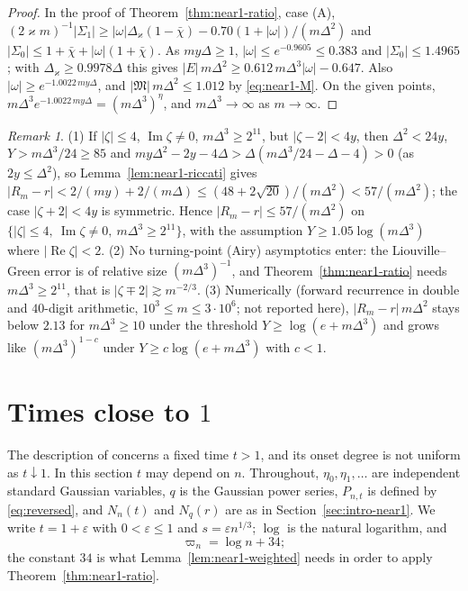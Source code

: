 \documentclass[11pt]{amsart}
\theoremstyle{definition}
\theoremstyle{remark}
\newtheorem{remark}[theorem]{Remark}
\numberwithin{equation}{section}
\newcommand{\eps}{\varepsilon}
\DeclareMathOperator{\re}{Re}
\DeclareMathOperator{\im}{Im}
\begin{document}
\begin{proof}
In the proof of Theorem~\ref{thm:near1-ratio}, case (A), $(2\varkappa m)^{-1}|\Sigma_1|\ge|\omega|\Delta_\varkappa(1-\bar\chi)-0.70(1+|\omega|)/(m\Delta^2)$ and $|\Sigma_0|\le1+\bar\chi+|\omega|(1+\bar\chi)$. As $my\Delta\ge1$, $|\omega|\le e^{-0.9605}\le0.383$ and $|\Sigma_0|\le1.4965$; with $\Delta_\varkappa\ge0.9978\Delta$ this gives $|E|\,m\Delta^2\ge0.612\,m\Delta^3|\omega|-0.647$. Also $|\omega|\ge e^{-1.0022\,my\Delta}$, and $|\mathfrak M|\,m\Delta^2\le1.012$ by \eqref{eq:near1-M}. On the given points, $m\Delta^3e^{-1.0022\,my\Delta}=(m\Delta^3)^\eta$, and $m\Delta^3\to\infty$ as $m\to\infty$.
\end{proof}

\begin{remark}\label{rem:near1-ratio}
(1) If $|\zeta|\le4$, $\im\zeta\ne0$, $m\Delta^3\ge2^{11}$, but $|\zeta-2|<4y$, then $\Delta^2<24y$, $Y>m\Delta^3/24\ge85$ and $my\Delta^2-2y-4\Delta>\Delta(m\Delta^3/24-\Delta-4)>0$ (as $2y\le\Delta^2$), so Lemma~\ref{lem:near1-riccati} gives $|R_m-r|<2/(my)+2/(m\Delta)\le(48+2\sqrt{20})/(m\Delta^2)<57/(m\Delta^2)$; the case $|\zeta+2|<4y$ is symmetric. Hence $|R_m-r|\le57/(m\Delta^2)$ on $\{|\zeta|\le4,\ \im\zeta\ne0,\ m\Delta^3\ge2^{11}\}$, with the assumption $Y\ge1.05\log(m\Delta^3)$ where $|\re\zeta|<2$.
(2) No turning-point (Airy) asymptotics enter: the Liouville--Green error is of relative size $(m\Delta^3)^{-1}$, and Theorem~\ref{thm:near1-ratio} needs $m\Delta^3\ge2^{11}$, that is $|\zeta\mp2|\gtrsim m^{-2/3}$.
(3) Numerically (forward recurrence in double and $40$-digit arithmetic, $10^3\le m\le3\cdot10^6$; not reported here), $|R_m-r|\,m\Delta^2$ stays below $2.13$ for $m\Delta^3\ge10$ under the threshold $Y\ge\log(e+m\Delta^3)$ and grows like $(m\Delta^3)^{1-c}$ under $Y\ge c\log(e+m\Delta^3)$ with $c<1$.
\end{remark}

\section{Times close to \texorpdfstring{$1$}{1}}\label{sec:times-near-1}

The description of \cite[Theorem~\ref{M-thm:heat}]{Main} concerns a fixed time $t>1$, and its onset degree is not uniform as $t\downarrow1$. In this section $t$ may depend on $n$. Throughout, $\eta_0,\eta_1,\dots$ are independent standard Gaussian variables, $q$ is the Gaussian power series, $P_{n,t}$ is defined by \eqref{eq:reversed}, and $N_n(t)$ and $N_q(r)$ are as in Section~\ref{sec:intro-near1}. We write $t=1+\eps$ with $0<\eps\le1$ and $s=\eps n^{1/3}$; $\log$ is the natural logarithm, and
\[
\varpi_n=\log n+34 ;
\]
the constant $34$ is what Lemma~\ref{lem:near1-weighted} needs in order to apply Theorem~\ref{thm:near1-ratio}.
\end{document}
